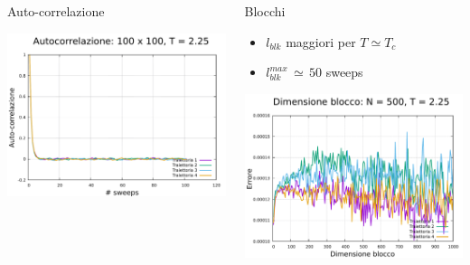 \begin{frame}
\begin{columns}
\begin{column}{0.33\textwidth}
\begin{block}{Auto-correlazione}
                \vspace{0.5cm}

                \centering
                \includegraphics[width=\textwidth]{Immagini/simIsing2D/autoW_100_2.25.pdf}

            \end{block}
        \end{column}

        \begin{column}{0.33\textwidth}
            \begin{block}{Blocchi}
                
                \begin{itemize}[itemsep=0.5em, label=$\diamond$]
                    \item $l_{blk}$ maggiori per $T \simeq T_c$
                    \item $l_{blk}^{max}\,\simeq\,50$ sweeps
                \end{itemize}

                \vspace{0.5cm}

                \centering
                \includegraphics[width=\textwidth]{Immagini/simIsing2D/errW_500_2.25.pdf}


\end{block}
\end{column}
\end{columns}
\end{frame}

